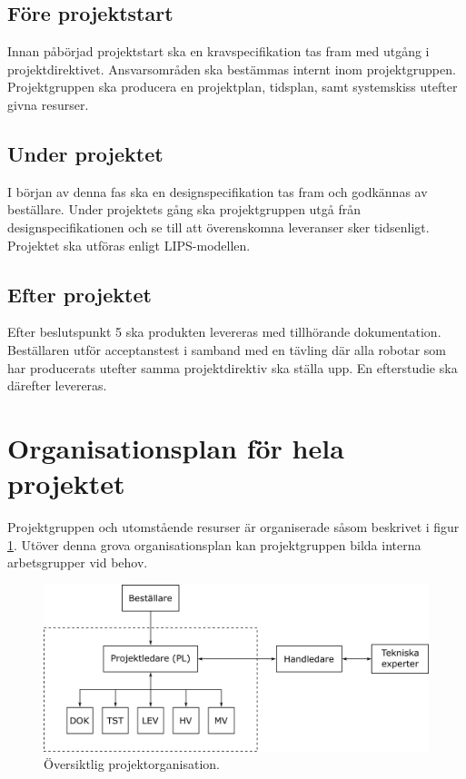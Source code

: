\documentclass[a4paper,11pt]{article}
\begin{document}
\subsection{Före projektstart}
Innan påbörjad projektstart ska en kravspecifikation tas fram med utgång i projektdirektivet. Ansvarsområden ska bestämmas internt inom projektgruppen. Projektgruppen ska producera en projektplan, tidsplan, samt systemskiss utefter givna resurser.

\subsection{Under projektet}
I början av denna fas ska en designspecifikation tas fram och godkännas av beställare. Under projektets gång ska projektgruppen utgå från designspecifikationen och se till att överenskomna leveranser sker tidsenligt. Projektet ska utföras enligt LIPS-modellen.

\subsection{Efter projektet}
Efter beslutspunkt 5 ska produkten levereras med tillhörande dokumentation. Beställaren utför acceptanstest i samband med en tävling där alla robotar som har producerats utefter samma projektdirektiv ska ställa upp. En efterstudie ska därefter levereras.


\section{Organisationsplan för hela projektet}
Projektgruppen och utomstående resurser är organiserade såsom beskrivet i figur \ref{fig:org}. Utöver denna grova organisationsplan kan projektgruppen bilda interna arbetsgrupper vid behov.

\begin{figure}[h!]
	\centering
	\includegraphics[scale=1]{organisation.png}
	\caption{Översiktlig projektorganisation.}
	\label{fig:org}
\end{figure}
\end{document}

